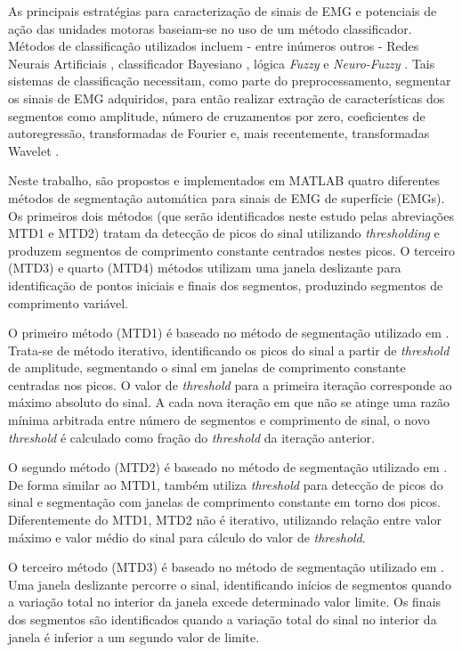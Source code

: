 As principais estratégias para caracterização de sinais de EMG e potenciais de ação das unidades motoras baseiam-se no uso de um método classificador. Métodos de classificação utilizados incluem - entre inúmeros outros - Redes Neurais Artificiais \cite{Hudgins1993}, classificador Bayesiano \cite{Englehart2003}, lógica \emph{Fuzzy} \cite{Chan2000} e \emph{Neuro-Fuzzy} \cite{Favieiro2011}. Tais sistemas de classificação necessitam, como parte do preprocessamento, segmentar os sinais de EMG adquiridos, para então realizar extração de características dos segmentos como amplitude, número de cruzamentos por zero, coeficientes de autoregressão, transformadas de Fourier e, mais recentemente, transformadas Wavelet \cite{Jun-UkChu2007}.

Neste trabalho, são propostos e implementados em MATLAB quatro diferentes métodos de segmentação automática para sinais de EMG de superfície (EMGs). Os primeiros dois métodos (que serão identificados neste estudo pelas abreviações MTD1 e MTD2) tratam da detecção de picos do sinal utilizando \emph{thresholding} e produzem segmentos de comprimento constante centrados nestes picos. O terceiro (MTD3) e quarto (MTD4) métodos utilizam uma janela deslizante para identificação de pontos iniciais e finais dos segmentos, produzindo segmentos de comprimento variável.

O primeiro método (MTD1) é baseado no método de segmentação utilizado em . Trata-se de método iterativo, identificando os picos do sinal a partir de \emph{threshold} de amplitude, segmentando o sinal em janelas de comprimento constante centradas nos picos. O valor de \emph{threshold} para a primeira iteração corresponde ao máximo absoluto do sinal. A cada nova iteração em que não se atinge uma razão mínima arbitrada entre número de segmentos e comprimento de sinal, o novo \emph{threshold} é calculado como fração do \emph{threshold} da iteração anterior.

O segundo método (MTD2) é baseado no método de segmentação utilizado em . De forma similar ao MTD1, também utiliza \emph{threshold} para detecção de picos do sinal e segmentação com janelas de comprimento constante em torno dos picos. Diferentemente do MTD1, MTD2 não é iterativo, utilizando relação entre valor máximo e valor médio do sinal para cálculo do valor de \emph{threshold}.

O terceiro método (MTD3) é baseado no método de segmentação utilizado em . Uma janela deslizante percorre o sinal, identificando inícios de segmentos quando a variação total no interior da janela excede determinado valor limite. Os finais dos segmentos são identificados quando a variação total do sinal no interior da janela é inferior a um segundo valor de limite.


